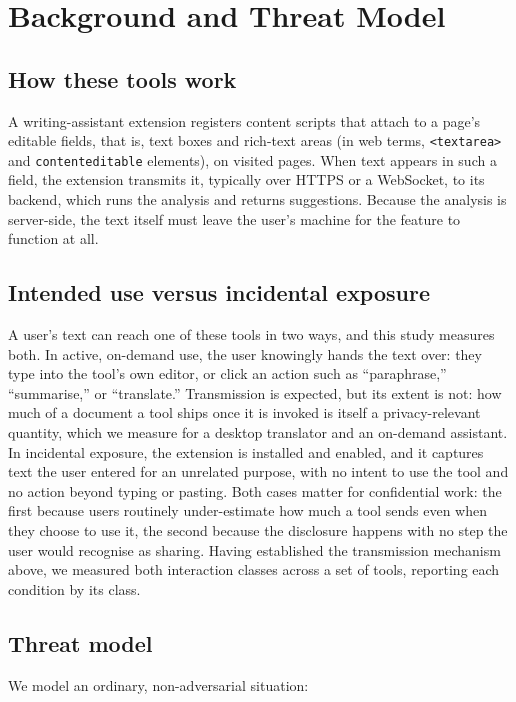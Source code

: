 \documentclass[10pt,conference,a4paper]{IEEEtran}
\begin{document}
\section{Background and Threat Model}
\label{sec:threat}

\subsection{How these tools work}
A writing-assistant extension registers content
scripts that attach to a page's editable fields, that is, text boxes and rich-text areas
(in web terms, \texttt{<textarea>} and \texttt{contenteditable} elements), on visited
pages. When text appears in such a field, the
extension transmits it, typically over HTTPS or a WebSocket, to its backend,
which runs the analysis and returns suggestions. Because the analysis is server-side,
the text itself must leave the user's machine for the feature to function at all.

\subsection{Intended use versus incidental exposure}
A user's text can reach one of these
tools in two ways, and this study measures both. In active, on-demand use, the user
knowingly hands the text over: they type into the tool's own editor, or click an action
such as ``paraphrase,'' ``summarise,'' or ``translate.'' Transmission is expected, but its
extent is not: how much of a document a tool ships once it is invoked is itself a
privacy-relevant quantity, which we measure for a desktop translator and an on-demand
assistant. In incidental exposure, the extension is installed and enabled, and it captures text
the user entered for an unrelated purpose, with no intent to use the tool and no action
beyond typing or pasting. Both cases
matter for confidential work: the first because users routinely under-estimate how much a
tool sends even when they choose to use it, the second because the disclosure happens with
no step the user would recognise as sharing. Having established the transmission mechanism
above, we measured both interaction classes across a set of tools, reporting each condition
by its class.

\subsection{Threat model}
We model an ordinary, non-adversarial situation:
\end{document}
